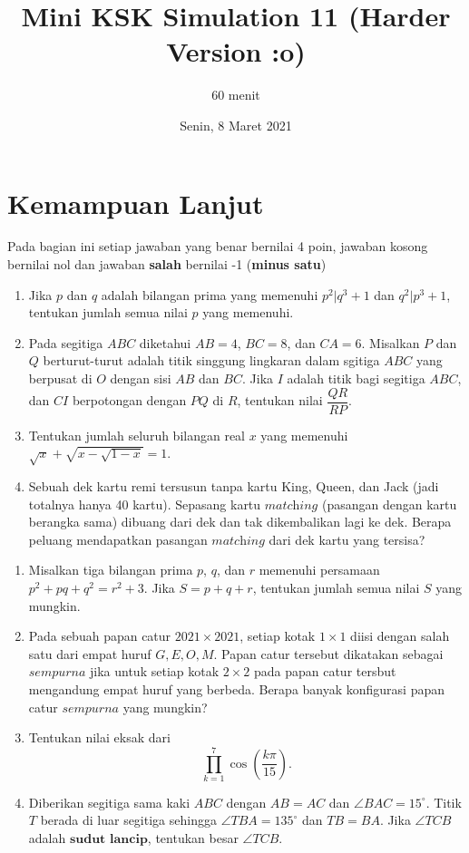 \documentclass[12pt]{scrartcl}
\title{Mini KSK Simulation 11 (Harder Version :o)}
\author{60 menit}
\date{Senin, 8 Maret 2021}
\begin{document}
	\maketitle

\renewcommand*\contentsname{Daftar Isi}
\tableofcontents

\newpage
\section{Kemampuan Lanjut}
Pada bagian ini setiap jawaban yang benar bernilai 4 poin, jawaban kosong bernilai nol
dan jawaban \textbf{salah} bernilai -1 (\textbf{minus satu})	
	\begin{enumerate}
		\item Jika $p$ dan $q$ adalah bilangan prima yang memenuhi $p^2|q^3+1$ dan $q^2|p^3+1$, tentukan jumlah semua nilai $p$ yang memenuhi.
		
		\item Pada segitiga $ABC$ diketahui $AB=4$, $BC=8$, dan $CA=6$. Misalkan $P$ dan $Q$ berturut-turut adalah titik singgung lingkaran dalam sgitiga $ABC$ yang berpusat di $O$ dengan sisi $AB$ dan $BC$. Jika $I$ adalah titik bagi segitiga $ABC$, dan $CI$ berpotongan dengan $PQ$ di $R$, tentukan nilai $\dfrac{QR}{RP}$.
		
		\item Tentukan jumlah seluruh bilangan real $x$ yang memenuhi $\sqrt{x}+\sqrt{x-\sqrt{1-x}}=1$.
		
		\item Sebuah dek kartu remi tersusun tanpa kartu King, Queen, dan Jack (jadi totalnya hanya 40 kartu). Sepasang kartu $\textit{matching}$ (pasangan dengan kartu berangka sama) dibuang dari dek dan tak dikembalikan lagi ke dek. Berapa peluang mendapatkan pasangan $\textit{matching}$ dari dek kartu yang tersisa? 
	\end{enumerate}



\begin{enumerate}[resume]
	\item Misalkan tiga bilangan prima $p$, $q$, dan $r$ memenuhi persamaan $p^2+pq+q^2=r^2+3.$ Jika $S=p+q+r$, tentukan jumlah semua nilai $S$ yang mungkin. 
	
	\item Pada sebuah papan catur $2021 \times 2021$, setiap kotak $1\times1$ diisi dengan salah satu dari empat huruf $G,E,O,M$. Papan catur tersebut dikatakan sebagai $\textit{sempurna}$ jika untuk setiap kotak $2\times2$ pada papan catur tersbut mengandung empat huruf yang berbeda. Berapa banyak konfigurasi papan catur $\textit{sempurna}$ yang mungkin?
	
	\item Tentukan nilai eksak dari $$\prod_{k=1}^{7}\cos \left ( \frac{k\pi}{15} \right ).$$
	
	\item Diberikan segitiga sama kaki $ABC$ dengan $AB=AC$ dan $\angle BAC = 15^\circ$. Titik $T$ berada di luar segitiga sehingga $\angle TBA = 135^\circ$ dan $TB = BA$. Jika $\angle TCB$ adalah $\textbf{sudut lancip}$, tentukan besar $\angle TCB$.
\end{enumerate}
\end{document}
